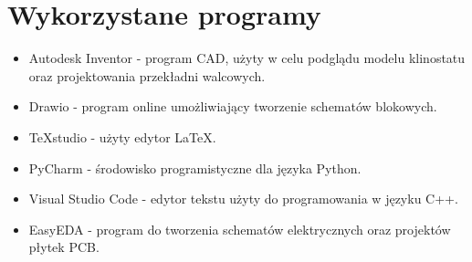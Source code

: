 \chapter*{Wykorzystane programy}

\begin{itemize}
	\item Autodesk Inventor - program CAD, użyty w celu podglądu modelu klinostatu oraz projektowania przekładni walcowych.
	\item Drawio - program online umożliwiający tworzenie schematów blokowych.
	\item TeXstudio - użyty edytor LaTeX.
	\item PyCharm - środowisko programistyczne dla języka Python.
	\item Visual Studio Code - edytor tekstu użyty do programowania w języku C++.
	\item EasyEDA - program do tworzenia schematów elektrycznych oraz projektów płytek PCB.
\end{itemize}